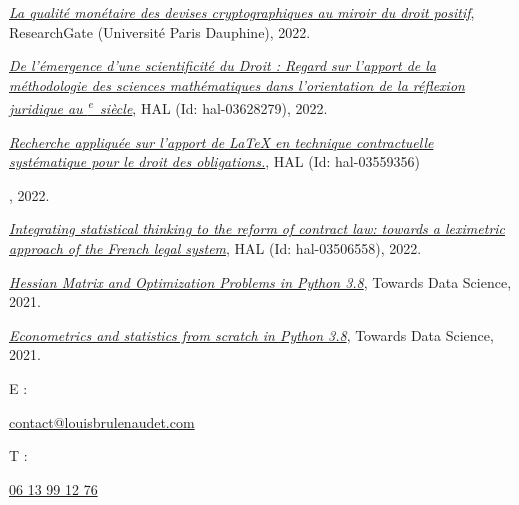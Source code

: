 \documentclass[french, 12pt]{article}
\def\siecle#1{\textsc{\romannumeral #1}\textsuperscript{e}~siècle}
\begin{document}
{
\vspace{0.5cm}

\href{https://www.researchgate.net/publication/360485939_La_qualite_monetaire_des_devises_cryptographiques_au_miroir_du_droit_positif}{\emph{La qualité monétaire des devises cryptographiques au miroir du droit positif}}, ResearchGate (Université Paris Dauphine), 2022.\vspace{0.7cm}

\href{https://hal.archives-ouvertes.fr/hal-03628279}{\emph{De l'émergence d'une scientificité du Droit : Regard sur l'apport de la méthodologie des sciences mathématiques dans l'orientation de la réflexion juridique au \siecle{17}}}, HAL (Id: hal-03628279), 2022.\vspace{0.7cm}

\href{https://hal.archives-ouvertes.fr/hal-03559356}{\emph{Recherche appliquée sur l'apport de LaTeX en technique contractuelle systématique pour le droit des obligations.}}, HAL (Id: hal-03559356)}, 2022.\vspace{0.7cm}

\href{https://hal.archives-ouvertes.fr/hal-03506558}{\emph{Integrating statistical thinking to the reform of contract law: towards a leximetric approach of the French legal system}}, HAL (Id: hal-03506558), 2022.\vspace{0.7cm}

\href{https://towardsdatascience.com/hessian-matrix-and-optimization-problems-in-python-3-8-f7cd2a615371}{\emph{Hessian Matrix and Optimization Problems in Python 3.8}}, Towards Data Science, 2021.\vspace{0.7cm}

\href{https://towardsdatascience.com/econometrics-and-statistics-from-scratch-in-python-3-8-linear-regression-mean-squared-error-9b81b8b84754}{\emph{Econometrics and statistics from scratch in Python 3.8}}, Towards Data Science, 2021.

\vspace{1.5cm}
\begin{center}
\small{\begin{ralewaysemibold}{E :}\end{ralewaysemibold} \ralewayLight \href{mailto:contact@louisbrulenaudet.com}{contact@louisbrulenaudet.com}}\hspace{2cm}
\small{\begin{ralewaysemibold}{T :}\end{ralewaysemibold} \ralewayLight\href{tel:0613991276}{06 13 99 12 76}}
\end{center}
\end{document}
